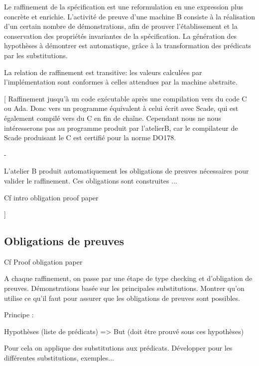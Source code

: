 Le raffinement de la spécification est une reformulation en une
expression plus concrète et enrichie.
L'activité de preuve d'une machine B consiste à la
réalisation d'un certain nombre de démonstrations, afin de prouver
l'établissement et la conservation des propriétés invariantes de la
spécification.
La génération des hypothèses à démontrer est automatique, grâce à la
transformation des prédicats par les substitutions. 

La relation de raffinement est transitive: les valeurs calculées par
l'implémentation sont conformes à celles attendues par la machine
abstraite. 

[
Raffinement jusqu'à un code exécutable après une compilation vers du
code C ou Ada. Donc vers un programme équivalent à celui écrit avec
Scade, qui est également compilé vers du C en fin de chaîne. Cependant
nous ne nous intéresserons pas au programme produit par l'atelierB,
car le compilateur de Scade produisant le C est certifié pour la norme
DO178.

-

L'atelier B produit automatiquement les obligations de preuves
nécessaires pour valider le raffinement. Ces obligations sont
construites ...

Cf intro obligation proof paper

]


\subsection{Obligations de preuves}
Cf Proof obligation paper

A chaque raffinement, on passe par une étape de type checking et
d'obligation de preuves. Démonstrations basée sur les principales
substitutions. Montrer qu'on utilise ce qu'il faut pour assurer que
les obligations de preuves sont possibles.

Principe :

Hypothèses (liste de prédicats)
=>
But (doit être prouvé sous ces hypothèses)

Pour cela on applique des substitutions aux prédicats. Développer pour les
différentes substitutions, exemples...

